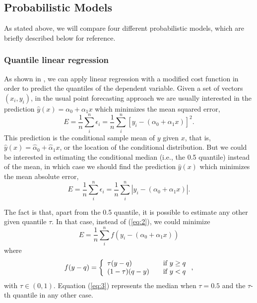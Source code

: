 \documentclass[a4paper,twocolumn,5p]{elsarticle}
\begin{document}
\subsection{Probabilistic Models}
\label{sec:models}

As stated above, we will compare four different probabilistic models,
which are briefly described below for reference.


\subsubsection{Quantile linear regression}

As shown in \cite{koenker_quantile_2001}, we can apply linear
regression with a modified cost function in order to predict the
quantiles of the dependent variable.  Given a set of vectors
$(x_i, y_i)$, in the usual point forecasting approach we are usually
interested in the prediction $\hat y(x) = \alpha_0 + \alpha_1 x$ which
minimizes the mean squared error,
\begin{equation}
  \label{eq:1}
  E = \frac{1}{n} \sum^n_i \epsilon_i =
  \frac{1}{n} \sum^n_i [ y_i - (\alpha_0 + \alpha_1 x) ]^2.
\end{equation}
This prediction is the conditional sample mean of $y$ given $x$, that
is, $\hat y(x) = \hat\alpha_0 + \hat\alpha_1 x$, or the location of
the conditional distribution. But we could be interested in estimating
the conditional median (i.e., the 0.5 quantile) instead of the mean,
in which case we should find the prediction $\hat y(x)$ which
minimizes the mean absolute error,
\begin{equation}
  \label{eq:2}
  E = \frac{1}{n} \sum^n_i \epsilon_i =
  \frac{1}{n} \sum^n_i | y_i - (\alpha_0 + \alpha_1 x) |.
\end{equation}

The fact is that, apart from the 0.5 quantile, it is possible to
estimate any other given quantile $\tau$. In that case, instead of
(\ref{eq:2}), we could minimize
\begin{equation}
  \label{eq:3}
  E= \frac{1}{n} \sum^n_i f( y_i - (\alpha_0 + \alpha_1 x))
\end{equation}
where
\begin{equation}
  \label{eq:4}
  f(y-q) = \left\{ 
    \begin{array}{l l}
      \tau (y-q) & \quad \mbox{if $y \ge q$}\\
      (1-\tau) (q-y) & \quad \mbox{if $y < q$}\\
    \end{array} \right.,
\end{equation}
with $\tau \in (0,1)$. Equation (\ref{eq:3}) represents the median
when $\tau=0.5$ and the $\tau$-th quantile in any other case.
\end{document}
